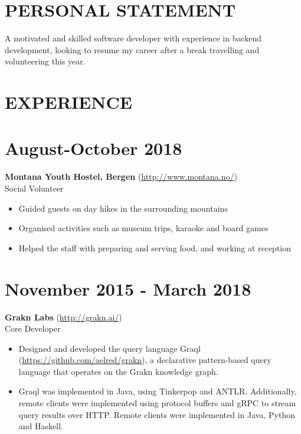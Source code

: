 \documentclass[margin]{res}
\begin{document}
\begin{resume}

\section{PERSONAL STATEMENT}

A motivated and skilled software developer with experience in backend development, looking to resume my career after a break travelling and volunteering this year.

\section{EXPERIENCE}

\normalsize{\section{August-October 2018}}
{\bf Montana Youth Hostel, Bergen} (\href{http://www.montana.no/}{http://www.montana.no/}) \\
Social Volunteer \\
\begin{itemize}
\item
Guided guests on day hikes in the surrounding mountains
\item
Organised activities such as museum trips, karaoke and board games
\item
Helped the staff with preparing and serving food, and working at reception
\end{itemize}

\normalsize{\section{November 2015 - March 2018}}
{\bf Grakn Labs} (\href{http://grakn.ai/}{http://grakn.ai/}) \\
Core Developer \\
\begin{itemize}

\item
Designed and developed the query language Graql (\href{https://github.com/aelred/grakn}{https://github.com/aelred/grakn}), a declarative pattern-based query language that operates on the Grakn knowledge graph.

\item
Graql was implemented in Java, using Tinkerpop and ANTLR. Additionally, remote clients were implemented using protocol buffers and gRPC to stream query results over HTTP. Remote clients were implemented in Java, Python and Haskell.


\end{itemize}
\end{resume}
\end{document}
